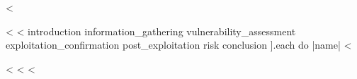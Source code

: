 \documentclass[10pt, a4paper, twoside]{report}
\begin{document}
  

  \tableofcontents

  \sloppy

  <%

  <%
    <%
      introduction
      information_gathering
      vulnerability_assessment
      exploitation_confirmation
      post_exploitation
      risk
      conclusion
    ].each do |name| %
      <%
        
      <%
    <%
  <%

  \printbibliography{}
\end{document}
